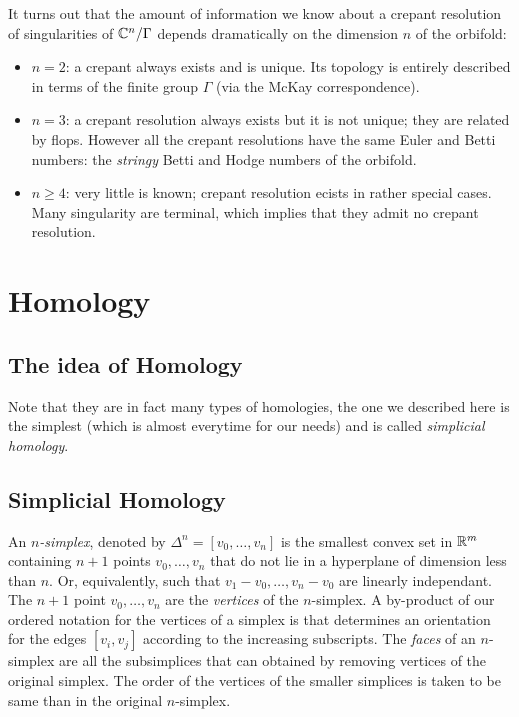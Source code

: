         It turns out that the amount of information we know about a crepant resolution of singularities of $\mathbb{C}^n/\Gamma$ depends dramatically on the dimension $n$ of the orbifold:
        \begin{itemize}
            \item $n=2$: a crepant always exists and is unique. Its topology is entirely described in terms of the finite group $\Gamma$ (via the McKay correspondence).
            \item $n=3$: a crepant resolution always exists but it is not unique; they are related by flops. However all the crepant resolutions have the same Euler and Betti numbers: the \emph{stringy} Betti and Hodge numbers of the orbifold.
            \item $n\geq4$: very little is known; crepant resolution ecists in rather special cases. Many singularity are terminal, which implies that they admit no crepant resolution.
        \end{itemize}

\section{Homology}

    \subsection{The idea of Homology}

        

        Note that they are in fact many types of homologies, the one we described here is the simplest (which is almost everytime for our needs) and is called \emph{simplicial homology}.

    \subsection{Simplicial Homology}

        An \emph{$n$-simplex}, denoted by $\Delta^n=[v_0,\dots,v_n]$ is the smallest convex set in $\mathbb{R}^m$ containing $n+1$ points $v_0,\dots,v_n$ that do not lie in a hyperplane of dimension less than $n$. Or, equivalently, such that $v_1-v_0,\dots,v_n-v_0$ are linearly independant. The $n+1$ point $v_0,\dots,v_n$ are the \emph{vertices} of the $n$-simplex. A by-product of our ordered notation for the vertices of a simplex is that determines an orientation for the edges $[v_i,v_j]$ according to the increasing subscripts. The \emph{faces} of an $n$-simplex are all the subsimplices that can obtained by removing vertices of the original simplex. The order of the vertices of the smaller simplices is taken to be same than in the original $n$-simplex. 
        
